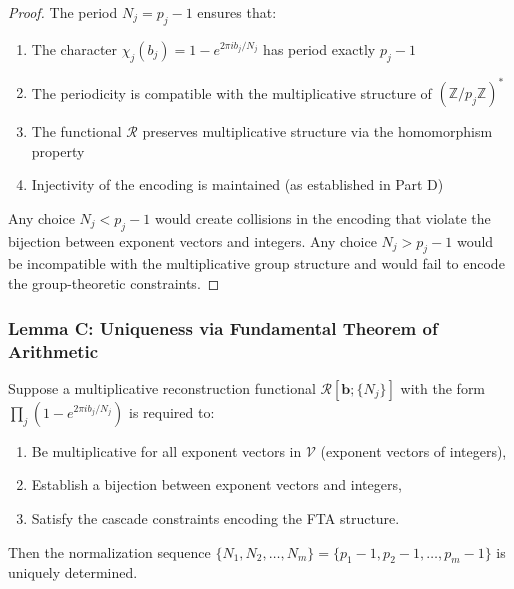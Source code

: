 \begin{proof}
The period $N_j = p_j - 1$ ensures that:
\begin{enumerate}
\item The character $\chi_j(b_j) = 1 - e^{2\pi i b_j / N_j}$ has period exactly $p_j - 1$
\item The periodicity is compatible with the multiplicative structure of $(\mathbb{Z}/p_j\mathbb{Z})^*$
\item The functional $\mathcal{R}$ preserves multiplicative structure via the homomorphism property
\item Injectivity of the encoding is maintained (as established in Part D)
\end{enumerate}

Any choice $N_j < p_j - 1$ would create collisions in the encoding that violate the bijection between exponent vectors and integers. Any choice $N_j > p_j - 1$ would be incompatible with the multiplicative group structure and would fail to encode the group-theoretic constraints.

\end{proof}


\subsubsection{Lemma C: Uniqueness via Fundamental Theorem of Arithmetic}
\label{subsubsec:lemma-c-uniqueness}

\begin{lemma}
\label{lem:uniqueness-primes}
Suppose a multiplicative reconstruction functional $\mathcal{R}[\mathbf{b}; \{N_j\}]$ with the form $\prod_j (1 - e^{2\pi i b_j / N_j})$ is required to:
\begin{enumerate}
\item Be multiplicative for all exponent vectors in $\mathcal{V}$ (exponent vectors of integers),
\item Establish a bijection between exponent vectors and integers,
\item Satisfy the cascade constraints encoding the FTA structure.
\end{enumerate}
Then the normalization sequence $\{N_1, N_2, \ldots, N_m\} = \{p_1 - 1, p_2 - 1, \ldots, p_m - 1\}$ is uniquely determined.
\end{lemma}

